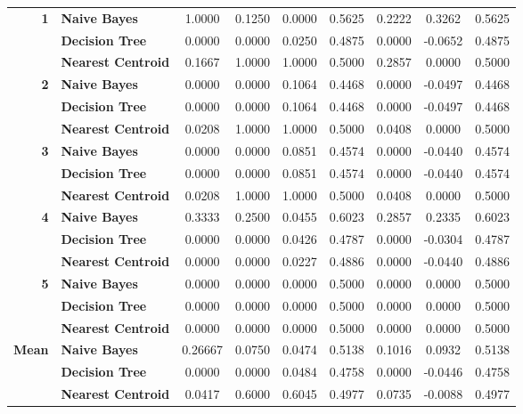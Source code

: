 \begin{center}
\begin{longtable}{ | r  l | c | c | c | c | c | c | c | }
\multirow{3}{*}{\textbf{1}} & \textbf{Naive Bayes} & 
1.0000 & 0.1250 & 0.0000 & 0.5625 & 0.2222 & 0.3262  & 0.5625 \\
& \textbf{Decision Tree} & 
0.0000 & 0.0000 & 0.0250 & 0.4875 & 0.0000 & -0.0652 & 0.4875 \\
& \textbf{Nearest Centroid} &
0.1667 & 1.0000 & 1.0000 & 0.5000 & 0.2857 & 0.0000  & 0.5000 \\
\hline
\multirow{3}{*}{\textbf{2}} & \textbf{Naive Bayes} & 
0.0000 & 0.0000 & 0.1064 & 0.4468 & 0.0000 & -0.0497 & 0.4468 \\
& \textbf{Decision Tree} & 
0.0000 & 0.0000 & 0.1064 & 0.4468 & 0.0000 & -0.0497 & 0.4468 \\
& \textbf{Nearest Centroid} &
0.0208 & 1.0000 & 1.0000 & 0.5000 & 0.0408 & 0.0000 & 0.5000 \\
\hline
\multirow{3}{*}{\textbf{3}} & \textbf{Naive Bayes} & 
0.0000 & 0.0000 & 0.0851 & 0.4574 & 0.0000 & -0.0440 & 0.4574 \\
& \textbf{Decision Tree} & 
0.0000 & 0.0000 & 0.0851 & 0.4574 & 0.0000 & -0.0440 & 0.4574 \\
& \textbf{Nearest Centroid} &
0.0208 & 1.0000 & 1.0000 & 0.5000 & 0.0408 &  0.0000 & 0.5000 \\
\hline
\multirow{3}{*}{\textbf{4}} & \textbf{Naive Bayes} & 
0.3333 & 0.2500 & 0.0455 & 0.6023 & 0.2857 &  0.2335 & 0.6023 \\
& \textbf{Decision Tree} & 
0.0000 & 0.0000 & 0.0426 & 0.4787 & 0.0000 & -0.0304 & 0.4787 \\
& \textbf{Nearest Centroid} &
0.0000 & 0.0000 & 0.0227 & 0.4886 & 0.0000 & -0.0440 & 0.4886 \\
\hline
\multirow{3}{*}{\textbf{5}} & \textbf{Naive Bayes} & 
0.0000 & 0.0000 & 0.0000 & 0.5000 & 0.0000 & 0.0000 & 0.5000 \\
& \textbf{Decision Tree} & 
0.0000 & 0.0000 & 0.0000 & 0.5000 & 0.0000 & 0.0000 & 0.5000 \\
& \textbf{Nearest Centroid} &
0.0000 & 0.0000 & 0.0000 & 0.5000 & 0.0000 & 0.0000 & 0.5000 \\
\hline
\hline
\multirow{3}{*}{\textbf{Mean}} & \textbf{Naive Bayes} & 
0.26667 & 0.0750 & 0.0474 & 0.5138 & 0.1016 & 0.0932 & 0.5138 \\
& \textbf{Decision Tree} & 
0.0000 & 0.0000 & 0.0484 & 0.4758 & 0.0000 & -0.0446 & 0.4758 \\
& \textbf{Nearest Centroid} &
0.0417 & 0.6000 & 0.6045 & 0.4977 & 0.0735 & -0.0088 & 0.4977 \\
\hline
\end{longtable}
\end{center}

